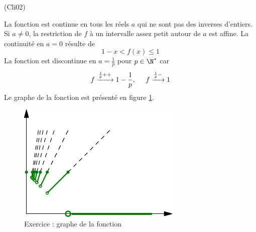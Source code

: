 \begin{tiny}(Cli02)\end{tiny} La fonction est continue en tous les réels $a$ qui ne sont pas des inverses d'entiers. Si $a\neq0$, la restriction de $f$ à un intervalle assez petit autour de $a$ est affine. La continuité en $a=0$ résulte de
\begin{displaymath}
  1-x < f(x) \leq 1 
\end{displaymath}
La fonction est discontinue en $a=\frac{1}{p}$ pour $p\in \N^*$ car
\begin{displaymath}
  f \xrightarrow{\frac{1}{p}++} 1- \frac{1}{p}, \hspace{0.5cm} f \xrightarrow{\frac{1}{p}-} 1
\end{displaymath}
Le graphe de la fonction est présenté en figure \ref{fig:Cli02_1}.
\begin{figure}[h!]
 \centering
 \includegraphics{./Cli02_1.pdf}
 \caption{Exercice  : graphe de la fonction}
 \label{fig:Cli02_1}
\end{figure}
